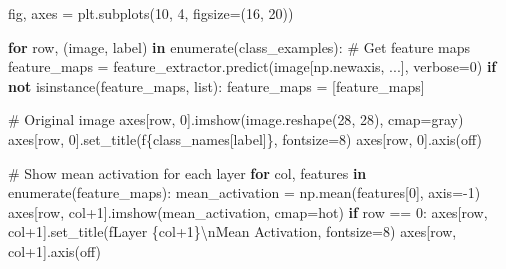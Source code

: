 \documentclass[
  letterpaper,
  DIV=11,
  numbers=noendperiod]{scrreprt}
\newenvironment{Shaded}{\begin{snugshade}}{\end{snugshade}}
\newcommand{\BuiltInTok}[1]{\textcolor[rgb]{0.00,0.23,0.31}{#1}}
\newcommand{\CharTok}[1]{\textcolor[rgb]{0.13,0.47,0.30}{#1}}
\newcommand{\CommentTok}[1]{\textcolor[rgb]{0.37,0.37,0.37}{#1}}
\newcommand{\ControlFlowTok}[1]{\textcolor[rgb]{0.00,0.23,0.31}{\textbf{#1}}}
\newcommand{\DecValTok}[1]{\textcolor[rgb]{0.68,0.00,0.00}{#1}}
\newcommand{\KeywordTok}[1]{\textcolor[rgb]{0.00,0.23,0.31}{\textbf{#1}}}
\newcommand{\NormalTok}[1]{\textcolor[rgb]{0.00,0.23,0.31}{#1}}
\newcommand{\OperatorTok}[1]{\textcolor[rgb]{0.37,0.37,0.37}{#1}}
\newcommand{\SpecialCharTok}[1]{\textcolor[rgb]{0.37,0.37,0.37}{#1}}
\newcommand{\SpecialStringTok}[1]{\textcolor[rgb]{0.13,0.47,0.30}{#1}}
\newcommand{\StringTok}[1]{\textcolor[rgb]{0.13,0.47,0.30}{#1}}
\begin{document}
\begin{Shaded}
\begin{Highlighting}[]
\NormalTok{    fig, axes }\OperatorTok{=}\NormalTok{ plt.subplots(}\DecValTok{10}\NormalTok{, }\DecValTok{4}\NormalTok{, figsize}\OperatorTok{=}\NormalTok{(}\DecValTok{16}\NormalTok{, }\DecValTok{20}\NormalTok{))}
    
    \ControlFlowTok{for}\NormalTok{ row, (image, label) }\KeywordTok{in} \BuiltInTok{enumerate}\NormalTok{(class\_examples):}
        \CommentTok{\# Get feature maps}
\NormalTok{        feature\_maps }\OperatorTok{=}\NormalTok{ feature\_extractor.predict(image[np.newaxis, ...], verbose}\OperatorTok{=}\DecValTok{0}\NormalTok{)}
        \ControlFlowTok{if} \KeywordTok{not} \BuiltInTok{isinstance}\NormalTok{(feature\_maps, }\BuiltInTok{list}\NormalTok{):}
\NormalTok{            feature\_maps }\OperatorTok{=}\NormalTok{ [feature\_maps]}
        
        \CommentTok{\# Original image}
\NormalTok{        axes[row, }\DecValTok{0}\NormalTok{].imshow(image.reshape(}\DecValTok{28}\NormalTok{, }\DecValTok{28}\NormalTok{), cmap}\OperatorTok{=}\StringTok{\textquotesingle{}gray\textquotesingle{}}\NormalTok{)}
\NormalTok{        axes[row, }\DecValTok{0}\NormalTok{].set\_title(}\SpecialStringTok{f\textquotesingle{}}\SpecialCharTok{\{}\NormalTok{class\_names[label]}\SpecialCharTok{\}}\SpecialStringTok{\textquotesingle{}}\NormalTok{, fontsize}\OperatorTok{=}\DecValTok{8}\NormalTok{)}
\NormalTok{        axes[row, }\DecValTok{0}\NormalTok{].axis(}\StringTok{\textquotesingle{}off\textquotesingle{}}\NormalTok{)}
        
        \CommentTok{\# Show mean activation for each layer}
        \ControlFlowTok{for}\NormalTok{ col, features }\KeywordTok{in} \BuiltInTok{enumerate}\NormalTok{(feature\_maps):}
\NormalTok{            mean\_activation }\OperatorTok{=}\NormalTok{ np.mean(features[}\DecValTok{0}\NormalTok{], axis}\OperatorTok{={-}}\DecValTok{1}\NormalTok{)}
\NormalTok{            axes[row, col}\OperatorTok{+}\DecValTok{1}\NormalTok{].imshow(mean\_activation, cmap}\OperatorTok{=}\StringTok{\textquotesingle{}hot\textquotesingle{}}\NormalTok{)}
            \ControlFlowTok{if}\NormalTok{ row }\OperatorTok{==} \DecValTok{0}\NormalTok{:}
\NormalTok{                axes[row, col}\OperatorTok{+}\DecValTok{1}\NormalTok{].set\_title(}\SpecialStringTok{f\textquotesingle{}Layer }\SpecialCharTok{\{}\NormalTok{col}\OperatorTok{+}\DecValTok{1}\SpecialCharTok{\}}\CharTok{\textbackslash{}n}\SpecialStringTok{Mean Activation\textquotesingle{}}\NormalTok{, fontsize}\OperatorTok{=}\DecValTok{8}\NormalTok{)}
\NormalTok{            axes[row, col}\OperatorTok{+}\DecValTok{1}\NormalTok{].axis(}\StringTok{\textquotesingle{}off\textquotesingle{}}\NormalTok{)}
    

\end{Highlighting}
\end{Shaded}
\end{document}
